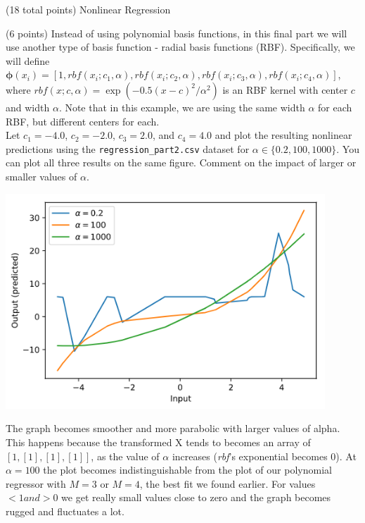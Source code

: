 \documentclass[12pt]{article}
\begin{document}
\begin{question}{(18 total points) Nonlinear Regression}
%
%
\begin{subquestion}{(6 points) Instead of using polynomial basis functions, in this final part we will use another type of basis function - radial basis functions (RBF). 
Specifically, we will define $\boldsymbol{\phi}(x_i) = [1, rbf(x_i; c_1, \alpha), rbf(x_i; c_2, \alpha), rbf(x_i; c_3, \alpha), rbf(x_i; c_4, \alpha)]$, where $rbf(x; c, \alpha) =  \exp(-0.5(x-c)^2 / \alpha^2)$ is an RBF kernel with center $c$ and width $\alpha$. Note that in this example, we are using the same width $\alpha$ for each RBF, but different centers for each.\\ 
Let $c_1=-4.0$, $c_2=-2.0$, $c_3=2.0$, and $c_4=4.0$ and plot the resulting nonlinear predictions using the \texttt{regression\_part2.csv} dataset for $\alpha \in \{0.2, 100, 1000\}$. 
You can plot all three results on the same figure.
Comment on the impact of larger or smaller values of $\alpha$.
}


\begin{answerbox}{35em}
\begin{center}
    \includegraphics[width=0.9\textwidth]{results/rbf-alpha-predictions.png}
\end{center}
The graph becomes smoother and more parabolic with larger values of alpha. This happens because the transformed X tends to becomes an array of $[1 , [1], [1], [1]]$, as the value of $\alpha$ increases (\textit{rbf}'s exponential becomes 0). At $\alpha = 100$ the plot becomes indistinguishable from the plot of our polynomial regressor with $M=3$ or $M=4$, the best fit we found earlier. For values $ < 1 and > 0$ we get really small values close to zero and the graph becomes rugged and fluctuates a lot.
\end{answerbox}



\end{subquestion}



\end{question}
\end{document}
